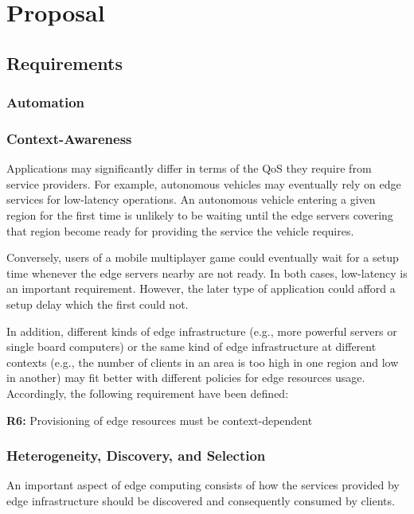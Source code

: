 \section{Proposal}\label{sec:proposal}

\subsection{Requirements}

\subsubsection{Automation}



\subsubsection{Context-Awareness}

Applications may significantly differ in terms of the QoS they require from service providers. For example, autonomous vehicles may eventually rely on edge services for low-latency operations. An autonomous vehicle entering a given region for the first time is unlikely to be waiting until the edge servers covering that region become ready for providing the service the vehicle requires. 

Conversely, users of a mobile multiplayer game could eventually wait for a setup time whenever the edge servers nearby are not ready. In both cases, low-latency is an important requirement. However, the later type of application could afford a setup delay which the first could not. 

In addition, different kinds of edge infrastructure (e.g., more powerful servers or single board computers) or the same kind of edge infrastructure at different contexts (e.g., the number of clients in an area is too high in one region and low in another) may fit better with different policies for edge resources usage. Accordingly, the following requirement have been defined:

\textbf{R6:} Provisioning of edge resources must be context-dependent

\subsubsection{Heterogeneity, Discovery, and Selection}

An important aspect of edge computing consists of how the services provided by edge infrastructure should be discovered and consequently consumed by clients. 

